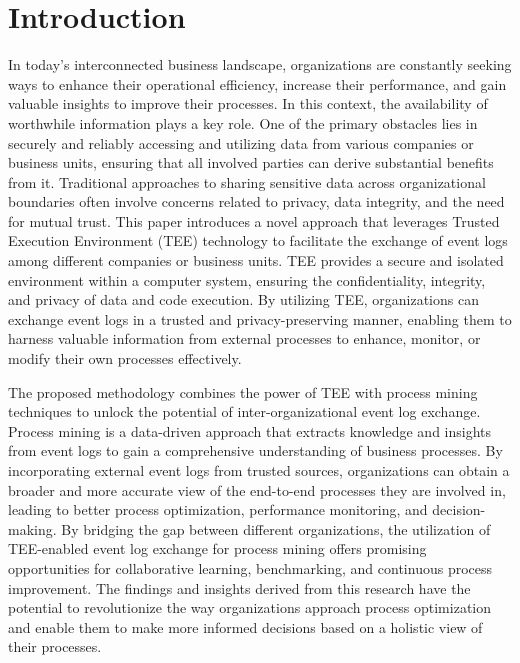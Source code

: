 \section{Introduction}
In today's interconnected business landscape, organizations are constantly seeking ways to enhance their operational efficiency, increase their performance, and gain valuable insights to improve their processes. In this context, the availability of worthwhile information plays a key role. One of the primary obstacles lies in securely and reliably accessing and utilizing data from various companies or business units, ensuring that all involved parties can derive substantial benefits from it. Traditional approaches to sharing sensitive data across organizational boundaries often involve concerns related to privacy, data integrity, and the need for mutual trust. This paper introduces a novel approach that leverages Trusted Execution Environment (TEE) technology to facilitate the exchange of event logs among different companies or business units. TEE provides a secure and isolated environment within a computer system, ensuring the confidentiality, integrity, and privacy of data and code execution. By utilizing TEE, organizations can exchange event logs in a trusted and privacy-preserving manner, enabling them to harness valuable information from external processes to enhance, monitor, or modify their own processes effectively.

The proposed methodology combines the power of TEE with process mining techniques to unlock the potential of inter-organizational event log exchange. Process mining is a data-driven approach that extracts knowledge and insights from event logs to gain a comprehensive understanding of business processes. By incorporating external event logs from trusted sources, organizations can obtain a broader and more accurate view of the end-to-end processes they are involved in, leading to better process optimization, performance monitoring, and decision-making. By bridging the gap between different organizations, the utilization of TEE-enabled event log exchange for process mining offers promising opportunities for collaborative learning, benchmarking, and continuous process improvement. The findings and insights derived from this research have the potential to revolutionize the way organizations approach process optimization and enable them to make more informed decisions based on a holistic view of their processes.


\label{sec:introduction}